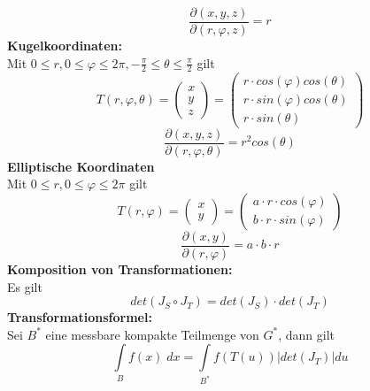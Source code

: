 \documentclass[a4paper,twocolumn,10pt]{article}
\begin{document}
\begin{equation*}
\frac{\partial (x,y,z)}{\partial (r,\varphi,z)}=r
\end{equation*}
\textbf{Kugelkoordinaten:}\\
Mit $0\leq r,0\leq \varphi\leq 2\pi,-\frac{\pi}{2}\leq \theta\leq\frac{\pi}{2}$ gilt
\begin{equation*}
T(r,\varphi,\theta)=\begin{pmatrix}x \\ y \\ z\end{pmatrix}=\begin{pmatrix}r\cdot cos(\varphi)cos(\theta) \\ r\cdot sin(\varphi)cos(\theta) \\ r\cdot sin(\theta)\end{pmatrix}
\end{equation*}
\begin{equation*}
\frac{\partial (x,y,z)}{\partial (r,\varphi,\theta)}=r^2cos(\theta)
\end{equation*}
\textbf{Elliptische Koordinaten}\\
Mit $0\leq r, 0\leq \varphi\leq 2\pi$ gilt
\begin{equation*}
T(r,\varphi)=\begin{pmatrix}x \\ y \end{pmatrix}=\begin{pmatrix}a\cdot r\cdot cos(\varphi) \\ b\cdot r\cdot sin(\varphi)\end{pmatrix}
\end{equation*}
\begin{equation*}
\frac{\partial (x,y)}{\partial (r,\varphi)}=a\cdot b\cdot r
\end{equation*}
\textbf{Komposition von Transformationen:}\\
Es gilt
\begin{equation*}
det(J_S\circ J_T)=det(J_S)\cdot det(J_T)
\end{equation*}
\textbf{Transformationsformel:}\\
Sei $B^*$ eine messbare kompakte Teilmenge von $G^*$, dann gilt
\begin{equation*}
\int\limits_{B}f(x)\;dx=\int\limits_{B^*}f(T(u))|det(J_T)|du
\end{equation*}
\end{document}
